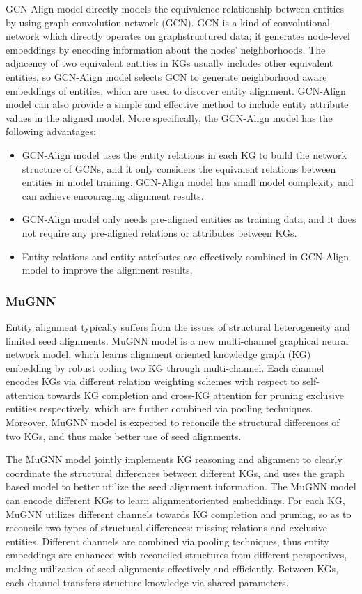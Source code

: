 \documentclass[sigconf]{acmart}
\begin{document}
{GCN-Align model directly models the equivalence relationship between entities by using graph convolution network (GCN). GCN is a kind of convolutional network which directly operates on graphstructured data; it generates node-level embeddings by encoding information about the nodes’ neighborhoods. The adjacency of two equivalent entities in KGs usually includes other equivalent entities, so GCN-Align model selects GCN to generate neighborhood aware embeddings of entities, which are used to discover entity alignment. GCN-Align model can also provide a simple and effective method to include entity attribute values in the aligned model. More specifically, the GCN-Align model has the following advantages:
\begin{itemize}
\item GCN-Align model uses the entity relations in each KG to build the network structure of GCNs, and it only considers the equivalent relations between entities in model training. GCN-Align model has small model complexity and can achieve encouraging alignment results.
\item GCN-Align model only needs pre-aligned entities as training data, and it does not require any pre-aligned relations or attributes between KGs.
\item Entity relations and entity attributes are effectively combined in GCN-Align model to improve the alignment results.
\end{itemize}

\subsubsection{MuGNN \cite{cao2019multi}}

Entity alignment typically suffers from the issues of structural heterogeneity and limited seed alignments. MuGNN model is a new multi-channel graphical neural network model, which learns alignment oriented knowledge graph (KG) embedding by robust coding two KG through multi-channel. Each channel encodes KGs via different relation weighting schemes with respect to self-attention towards KG completion and cross-KG attention for pruning exclusive entities respectively, which are further combined via pooling techniques. Moreover, MuGNN model is expected to reconcile the structural differences of two KGs, and thus make better use of seed alignments.

The MuGNN model jointly implements KG reasoning and alignment to clearly coordinate the structural differences between different KGs, and uses the graph based model to better utilize the seed alignment information. The MuGNN model can encode different KGs to learn alignmentoriented embeddings. For each KG, MuGNN utilizes different channels towards KG completion and pruning, so as to reconcile two types of structural differences: missing relations and exclusive entities. Different channels are combined via pooling techniques, thus entity embeddings are enhanced with reconciled structures from different perspectives, making utilization of seed alignments effectively and efficiently. Between KGs, each channel transfers structure knowledge via shared parameters.

}
\end{document}

